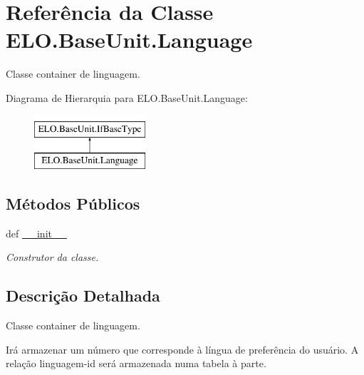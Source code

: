 \hypertarget{classELO_1_1BaseUnit_1_1Language}{\section{Referência da Classe E\-L\-O.\-Base\-Unit.\-Language}
\label{classELO_1_1BaseUnit_1_1Language}
}


Classe container de linguagem.  


Diagrama de Hierarquia para E\-L\-O.\-Base\-Unit.\-Language\-:\begin{figure}[H]
\begin{center}
\leavevmode
\includegraphics[height=2.000000cm]{d2/d3e/classELO_1_1BaseUnit_1_1Language}
\end{center}
\end{figure}
\subsection*{Métodos Públicos}
\begin{DoxyCompactItemize}
\item 
def \hyperlink{classELO_1_1BaseUnit_1_1Language_a0b717ad014a17f87cbe20caf5be56fb8}{\-\_\-\-\_\-init\-\_\-\-\_\-}
\begin{DoxyCompactList}\small\item\em Construtor da classe. \end{DoxyCompactList}\end{DoxyCompactItemize}


\subsection{Descrição Detalhada}
Classe container de linguagem. 

Irá armazenar um número que corresponde à língua de preferência do usuário. A relação linguagem-\/id será armazenada numa tabela à parte. 

